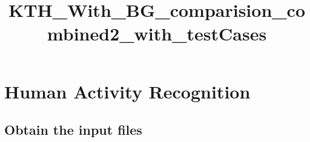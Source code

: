 \documentclass[11pt]{article}
\title{KTH\_With\_BG\_comparision\_combined2\_with\_testCases}
\begin{document}
    
    
    \maketitle
    
    

    
    \hypertarget{human-activity-recognition}{%
\section{Human Activity Recognition}\label{human-activity-recognition}}

\hypertarget{obtain-the-input-files}{%
\subsection{Obtain the input files}\label{obtain-the-input-files}}
\end{document}
